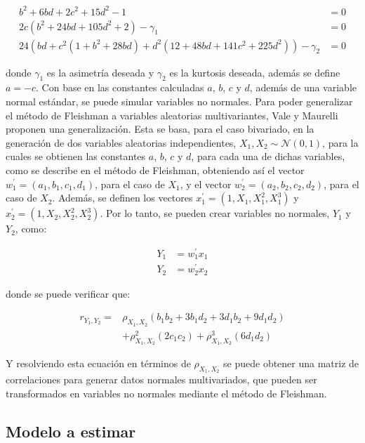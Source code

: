 \documentclass[english]{revcoles}
\begin{document}
\begin{align*}
  b^2 + 6bd + 2c^2 + 15d^2 -1                                                               & = 0 \\
  2c (b^2 + 24bd + 105d^2 + 2) - \gamma_1                                                   & = 0 \\
  24 \left(bd + c^2 (1 + b^2 + 28bd) + d^2 (12 + 48bd + 141c^2 + 225d^2) \right) - \gamma_2 & = 0
\end{align*}

donde \(\gamma_1\) es la asimetría deseada y \(\gamma_2\) es la kurtosis deseada, además se define \(a = -c\). Con base en las constantes calculadas \(a\), \(b\), \(c\) y \(d\), además de una variable normal estándar, se puede simular variables no normales. Para poder generalizar el método de Fleishman a variables aleatorias multivariantes, Vale y Maurelli proponen una generalización. Esta se basa, para el caso bivariado, en la generación de dos variables aleatorias independientes, \(X_1, X_2 \sim \mathcal{N} (0,1)\), para la cuales se obtienen las constantes \(a\), \(b\), \(c\) y \(d\), para cada una de dichas variables, como se describe en el método de Fleishman, obteniendo así el vector \(w^\prime_1 = (a_1, b_1, c_1, d_1)\), para el caso de \(X_1\), y el vector \(w^\prime_2 = (a_2, b_2, c_2, d_2)\), para el caso de \(X_2\). Además, se definen los vectores \(x_1^\prime = (1, X_1, X_1^2, X_1^3)\) y \(x_2^\prime = (1, X_2, X_2^2, X_2^3)\). Por lo tanto, se pueden crear variables no normales, \(Y_1\) y \(Y_2\), como:

\begin{align*}
  Y_1 & = w_1^\prime x_1 \\
  Y_2 & = w_2^\prime x_2
\end{align*}

donde se puede verificar que:

\begin{align*}
  r_{Y_1, Y_2} = & \rho_{X_1, X_2} (b_1 b_2 + 3b_1 d_2 + 3d_1 b_2 + 9 d_1 d_2)     \\
                 & + \rho_{X_1, X_2}^2 (2 c_1 c_2) + \rho_{X_1, X_2}^3 (6 d_1 d_2)
\end{align*}

Y resolviendo esta ecuación en términos de \(\rho_{X_1, X_2}\) se puede obtener una matriz de correlaciones para generar datos normales multivariados, que pueden ser transformados en variables no normales mediante el método de Fleishman.

\subsection{Modelo a estimar}
\end{document}
